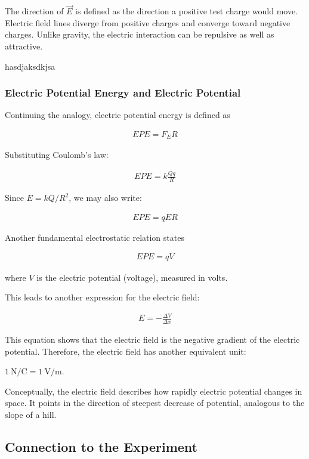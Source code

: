 \documentclass[12pt]{article}
\begin{document}
The direction of $\vec{E}$ is defined as the direction a positive test charge
would move. Electric field lines diverge from positive charges and converge
toward negative charges. Unlike gravity, the electric interaction can be
repulsive as well as attractive.

hasdjaksdkjsa

\subsubsection*{Electric Potential Energy and Electric Potential}

Continuing the analogy, electric potential energy is defined as

\begin{align*}
EPE = F_E R
\end{align*}

Substituting Coulomb’s law:

\begin{align*}
EPE = k \frac{Q q}{R}
\end{align*}

Since $E = k Q / R^2$, we may also write:

\begin{align*}
EPE = q E R
\end{align*}

Another fundamental electrostatic relation states

\begin{align*}
EPE = q V
\end{align*}

where $V$ is the electric potential (voltage), measured in volts.

This leads to another expression for the electric field:

\begin{align*}
E = -\frac{\Delta V}{\Delta x}
\end{align*}

This equation shows that the electric field is the negative gradient of the
electric potential. Therefore, the electric field has another equivalent unit:

$1 \ \text{N/C} = 1 \ \text{V/m}$.

Conceptually, the electric field describes how rapidly electric potential
changes in space. It points in the direction of steepest decrease of
potential, analogous to the slope of a hill.

\subsection*{Connection to the Experiment}
\end{document}
